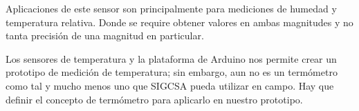 \par \noindent
Aplicaciones de este sensor son principalmente para mediciones de humedad y temperatura relativa. Donde se require obtener valores en ambas magnitudes y no tanta precisión de una magnitud en particular\cite{dht11}. 

\par \noindent
Los sensores de temperatura y la plataforma de Arduino nos permite crear un prototipo de medición de temperatura; sin embargo, aun no es un termómetro como tal y mucho menos uno que SIGCSA pueda utilizar en campo. Hay que definir el concepto de termómetro para aplicarlo en nuestro prototipo.

